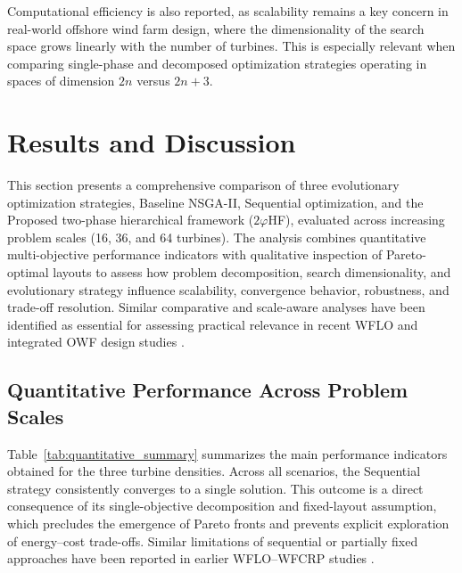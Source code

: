 \documentclass[format=sigconf,anonymous=true,review=true]{acmart}
\begin{document}
Computational efficiency is also reported, as scalability remains a key concern in real-world offshore wind farm design, where the dimensionality of the search space grows linearly with the number of turbines. This is especially relevant when comparing single-phase and decomposed optimization strategies operating in spaces of dimension $2n$ versus $2n+3$.

\section{Results and Discussion}
\label{sec:results}

This section presents a comprehensive comparison of three evolutionary optimization strategies, Baseline NSGA-II, Sequential optimization, and the Proposed two-phase hierarchical framework ($2\varphi$HF), evaluated across increasing problem scales (16, 36, and 64 turbines). The analysis combines quantitative multi-objective performance indicators with qualitative inspection of Pareto-optimal layouts to assess how problem decomposition, search dimensionality, and evolutionary strategy influence scalability, convergence behavior, robustness, and trade-off resolution. Similar comparative and scale-aware analyses have been identified as essential for assessing practical relevance in recent WFLO and integrated OWF design studies \cite{Jiang2025Review, Tao2025TwoStage}.

\subsection{Quantitative Performance Across Problem Scales}

Table~\ref{tab:quantitative_summary} summarizes the main performance indicators obtained for the three turbine densities. Across all scenarios, the Sequential strategy consistently converges to a single solution. This outcome is a direct consequence of its single-objective decomposition and fixed-layout assumption, which precludes the emergence of Pareto fronts and prevents explicit exploration of energy--cost trade-offs. Similar limitations of sequential or partially fixed approaches have been reported in earlier WFLO--WFCRP studies \cite{Fischetti2015MILP, Moon2015Optimal}.
\end{document}
